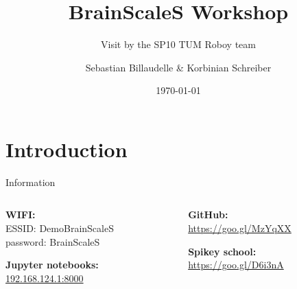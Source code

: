 \documentclass[aspectratio=169]{beamer}
\title{BrainScaleS Workshop}
\subtitle{Visit by the SP10 TUM Roboy team}
\date{\today}
\author{Sebastian Billaudelle \& Korbinian Schreiber}
\institute{Kirchhoff-Institute for Physics, Heidelberg University}
\begin{document}
\maketitle

\section{Introduction}

\begin{frame}{Information}
	\begin{columns}[onlytextwidth]
		\begin{column}{0.45\textwidth}
			\textbf{WIFI:} \\
			ESSID: DemoBrainScaleS \\
			password: BrainScaleS

			\vspace{3ex}

			\textbf{Jupyter notebooks:} \\
			\url{192.168.124.1:8000}
		\end{column}
		\hfill
		\begin{column}{0.45\textwidth}
			\textbf{GitHub:} \\
			\url{https://goo.gl/MzYqXX}

			\vspace{3ex}

			\textbf{Spikey school:} \\
			\url{https://goo.gl/D6i3nA}
		\end{column}
	\end{columns}
\end{frame}
\end{document}

